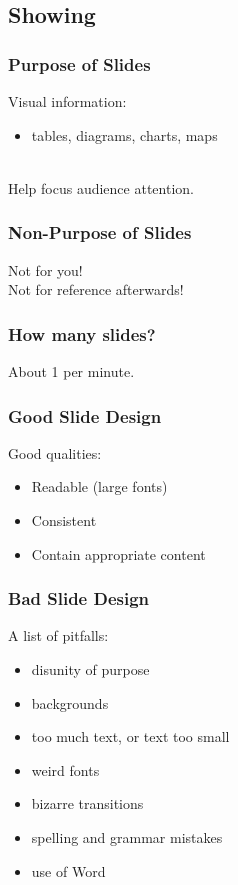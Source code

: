 \documentclass{beamer}
\begin{document}
\subsection{Showing}

\begin{frame}
\frametitle{Purpose of Slides}

\Large

Visual information: 
\begin{itemize}
\item tables, diagrams, charts, maps
\end{itemize}
~\\[1em]

Help focus audience attention.\\[1em]

\end{frame}

\begin{frame}
\frametitle{Non-Purpose of Slides}

\Large
Not for you!\\[1em]

Not for reference afterwards!
\end{frame}

\begin{frame}
\frametitle{How many slides?}

\Large
\begin{center}
About 1 per minute.
\end{center}

\end{frame}

\begin{frame}

\frametitle{Good Slide Design}

Good qualities:
\begin{itemize}
\item Readable (large fonts)
\item Consistent
\item Contain appropriate content
\end{itemize}

\end{frame}

\begin{frame}

\frametitle{Bad Slide Design}

A list of pitfalls:
\begin{itemize}
\item disunity of purpose
\item backgrounds
\item too much text, or text too small
\item weird fonts
\item bizarre transitions
\item spelling and grammar mistakes
\item use of Word
\end{itemize}

\end{frame}
\end{document}

